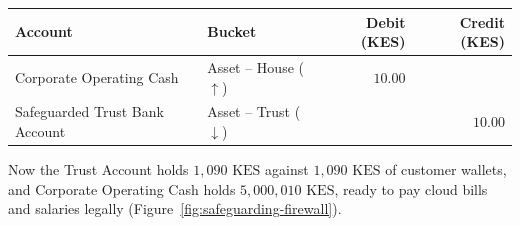 \begin{center}
\small
\begin{tabular}{llrr}
\toprule
\textbf{Account} & \textbf{Bucket} & \textbf{Debit (KES)} & \textbf{Credit (KES)} \\
\midrule
Corporate Operating Cash & Asset -- House ($\uparrow$) & $10.00$ & \\
Safeguarded Trust Bank Account & Asset -- Trust ($\downarrow$) & & $10.00$ \\
\bottomrule
\end{tabular}
\end{center}

Now the Trust Account holds $1{,}090\text{ KES}$ against $1{,}090\text{ KES}$ of customer wallets, and Corporate Operating Cash holds $5{,}000{,}010\text{ KES}$, ready to pay cloud bills and salaries legally (Figure~\ref{fig:safeguarding-firewall}).

